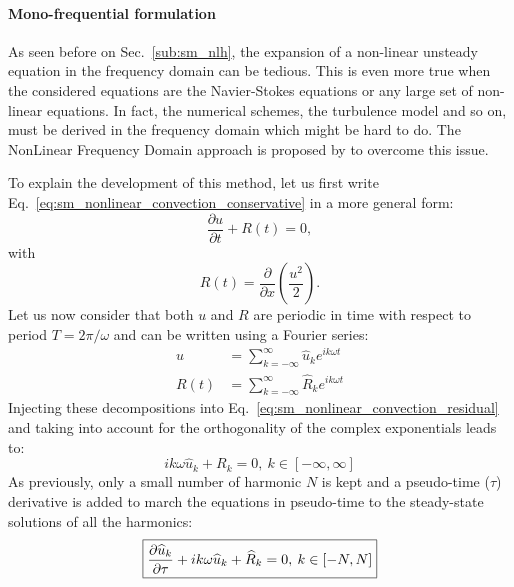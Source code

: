 
\paragraph{Mono-frequential formulation}

As seen before on Sec.~\ref{sub:sm_nlh}, the expansion of 
a non-linear unsteady equation in the frequency domain
can be tedious. This is even more true when the
considered equations are the Navier-Stokes equations
or any large set of non-linear equations. In
fact, the numerical schemes, the turbulence model and so
on, must be derived in the frequency domain which might be
hard to do. The NonLinear Frequency Domain approach is
proposed by \citet{McMullen2001} to overcome this issue.

To explain the development of this method, let us first 
write Eq.~\ref{eq:sm_nonlinear_convection_conservative} 
in a more general form:
\begin{equation}
	\frac{\partial u}{\partial t} + R (t) = 0,
	\label{eq:sm_nonlinear_convection_residual}
\end{equation}
with
\begin{equation}
	R(t) = \frac{\partial}{\partial x} \left( 
	\frac{u^2}{2} \right).
\end{equation}
Let us now consider that both $u$ and $R$ are periodic
in time with respect to period $T = 2 \pi / \omega$
and can be written using a Fourier series:
\begin{equation}
	\begin{split}
		u &= \sum_{k=-\infty}^{\infty} \widehat{u}_k e^{i k \omega t} \\
		R(t) &= \sum_{k=-\infty}^{\infty} \widehat{R}_k e^{i k \omega t}
	\end{split}
\end{equation}
Injecting these decompositions into 
Eq.~\ref{eq:sm_nonlinear_convection_residual} and taking into account
for the orthogonality of the complex exponentials leads to:
\begin{equation}
	i k \omega \widehat{u}_k + R_k = 0, \: k \in [-\infty, \infty]
\end{equation}
As previously, only a small number of harmonic $N$ is kept and 
a pseudo-time ($\tau$) derivative is added to march the equations
in pseudo-time to the steady-state solutions of all the harmonics:
\begin{equation}
	\fbox{$
	\displaystyle \frac{\partial \widehat{u}_k}{\partial \tau} + 
	i k \omega \widehat{u}_k + \widehat{R}_k = 0, \: k \in [-N, N]
	$}
	\label{eq:sm_nlfd_subset_eq}
\end{equation}
